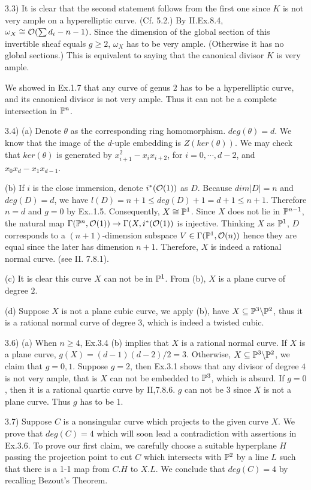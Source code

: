 3.3) It is clear that the second statement follows from the first one
since $K$ is not very ample on a hyperelliptic curve. (Cf. 5.2.)  By
II.Ex.8.4, $\omega_X\cong {\cal O}(\sum{d_i}-n-1)$. Since the
dimension of the global section of this invertible sheaf equals $g\geq
2$, $\omega_X$ has to be very ample. (Otherwise it has no global
sections.)  This is equivalent to saying that the canonical divisor
$K$ is very ample.

We showed in Ex.1.7 that any curve of genus $2$ has to be a
hyperelliptic curve, and its canonical divisor is not very ample.
Thus it can not be a complete intersection in ${\Bbb P}^n$.

3.4) (a) Denote $\theta$ as the corresponding ring homomorphism. $deg
(\theta)=d$. We know that the image of the $d$-uple embedding is
$Z(ker(\theta))$. We may check that $ker(\theta)$ is generated by
$x_{i+1}^2-{x_i}{x_{i+2}}$, for $i=0,\cdots, d-2$, and
$x_0x_d-x_1x_{d-1}$.

(b) If $i$ is the close immersion, denote $i^*({\cal O}(1))$ as
$D$. Because $dim |D|=n$ and $deg(D)=d$, we have $l(D)=n+1\leq
deg(D)+1=d+1\leq n+1$. Therefore $n=d$ and $g=0$ by
Ex..1.5. Consequently, $X\cong {\Bbb P}^1$. Since $X$ does not lie in ${\Bbb
P}^{n-1}$, the natural map ${\Gamma}({\Bbb P}^n,{\cal O}(1))\rightarrow
{\Gamma}(X,i^*({\cal O}(1))$ is injective. Thinking $X$ as ${\Bbb P}^1$, $D$
corresponds to a $(n+1)$-dimension subspace $V\in {\Gamma}({\Bbb P}^1,{\cal
O}(n))$ hence they are equal since the later has dimension
$n+1$. Therefore, $X$ is indeed a rational normal curve.  (see
II. 7.8.1).

(c) It is clear this curve $X$ can not be in ${\Bbb P}^1$. From (b), $X$ is a
plane curve of degree $2$.  

(d) Suppose $X$ is not a plane cubic curve, we apply (b), have
$X\subseteq {\Bbb P}^3\backslash {\Bbb P}^2$, thus it is a rational
normal curve of degree $3$, which is indeed a twisted cubic.

3.6) (a) When $n\geq 4$, Ex.3.4 (b) implies that $X$ is a rational
normal curve. If $X$ is a plane curve, $g(X)=(d-1)(d-2)/2=3$.
Otherwise, $X\subseteq {\Bbb P}^3\backslash {\Bbb P}^2$, we claim that
$g=0,1$. Suppose $g=2$, then Ex.3.1 shows that any divisor of degree
$4$ is not very ample, that is $X$ can not be embedded to ${\Bbb
P}^3$, which is absurd. If $g=0$, then it is a rational quartic curve
by II,7.8.6. $g$ can not be $3$ since $X$ is not a plane curve.  Thus
$g$ has to be 1.

3.7) Suppose $C$ is a nonsingular curve which projects to the given
curve $X$. We prove that $deg(C)=4$ which will soon lead a
contradiction with assertions in Ex.3.6. To prove our first claim,
we carefully choose a suitable hyperplane $H$ passing the projection
point to cut $C$ which intersects with ${\Bbb P}^2$ by a line $L$ such that
there is a 1-1 map from $C.H$ to $X.L$. We conclude that $deg(C)=4$ by
recalling Bezout's Theorem. 

